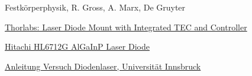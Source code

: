 \documentclass[a4paper,10pt]{scrartcl} %
\begin{document}
\begin{thebibliography}{9}
Festkörperphysik, R. Gross, A. Marx, De Gruyter

\href{https://www.thorlabs.de/newgrouppage9.cfm?objectgroup_id=5583&pn=LDM9T/M}{Thorlabs: Laser Diode Mount with Integrated TEC and Controller}

\href{https://lms.uibk.ac.at/auth/1%3A1%3A1052805258%3A2%3A0%3Aserv%3Ax/datasheet_HL6712G.pdf}{Hitachi HL6712G AlGaInP Laser Diode}

\href{https://lms.uibk.ac.at/auth/1%3A1%3A1050700822%3A2%3A0%3Aserv%3Ax/diode110.pdf}{Anleitung Versuch Diodenlaser, Universität Innsbruck}

\end{thebibliography}
\end{document}
